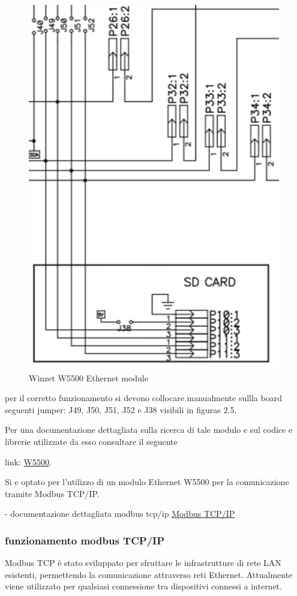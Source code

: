 \documentclass[12pt,a4paper]{report}
\begin{document}
\begin{figure}[H]
    \centering
    \includegraphics[width=0.7\linewidth]{../image/SD_and_W5500.png}
    \caption{Winzet W5500 Ethernet module}
\end{figure}

per il corretto funzionamento si devono collocare manualmente sullla board seguenti jumper: J49, J50, J51, J52 e J38 visibili in figuras 2.5.


Per una documentazione dettagliata sulla ricerca di tale modulo e sul codice e librerie utilizzate da esso consultare il seguente 

link: \href{https://github.com/AlessioTommasi-supsi/iotProject/blob/main/docs/ResearchEthModule/W5500Example/README.md}{W5500}.

Si e optato per l'utilizzo di un modulo Ethernet W5500 per la comunicazione tramite Modbus TCP/IP.

- documentazione dettagliata modbus tcp/ip \href{https://www.modbus.org/docs/Modbus_Messaging_Implementation_Guide_V1_0b.pdf}{Modbus TCP/IP}

\subsubsection{funzionamento modbus TCP/IP }
Modbus TCP è stato sviluppato per sfruttare le infrastrutture di rete LAN esistenti, permettendo la comunicazione attraverso reti Ethernet. Attualmente viene utilizzato per qualsiasi connessione tra dispositivi connessi a internet.
\end{document}
